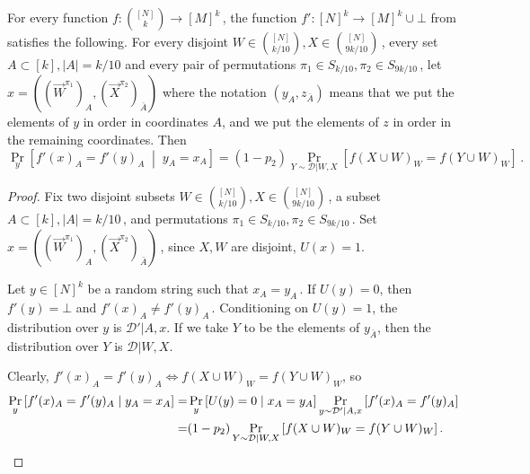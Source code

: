 \documentclass{toc}
\newcommand{\Prob}[2][]{\Pr_{{#1}}\left[#2\right]} %
\newcommand{\abs}[1]{\lvert#1\rvert} %
\newcommand{\given}{\;\middle\vert\;} %
\newcommand\f{f} %
\newcommand\setf{f} %
\newcommand{\sets}{\binom{[N]}{k}} %
\newcommand\rest[1]{{\bar{#1}}}  %
\begin{document}
\begin{claim} \label{claim:set to tuple equality}
	For every function $\setf:\sets\rightarrow[M]^k$\,, the function $\f':[N]^k\rightarrow[M]^k\cup\bot$ from  satisfies the following.
	For every disjoint $W\in\binom{[N]}{k/10}, X\in\binom{[N]}{9k/10}$\,, every set $A\subset[k],\abs{A}=k/10$ and
%
every pair of permutations  %
$\pi_1\in S_{k/10},\pi_2\in S_{9k/10}$\,, let $x=((\vec W^{\pi_1})_A,(\vec X^{\pi_2})_{\rest A})$ where the notation $(y_A, z_{\rest A})$ means that we put the elements of $y$ in order in coordinates $A$, and we put the elements of $z$ in order in the remaining coordinates. Then  
	\[ \Prob[y]{\f'(x)_A = \f'(y)_A\given y_A=x_A} =(1-p_2)\Prob[Y\sim\mathcal{D}|{W,X}]{\setf(X\cup W)_W = \setf(Y\cup W)_W}\,. \]
\end{claim}
\begin{proof}

    Fix two disjoint subsets $W\in\binom{[N]}{k/10}, X\in\binom{[N]}{9k/10}$\,, a subset $A\subset[k],\abs{A}=k/10$\,, and permutations $\pi_1\in
	{S}_{k/10},\pi_2\in{S}_{9k/10}$\,. Set $x=((\vec W^{\pi_1})_A,(\vec X^{\pi_2})_{\rest A})$\,, since $X,W$ are disjoint, $U(x)=1$. 
	
	Let $y\in[N]^k$ be a random string such that $x_A=y_A$\,. If $U(y)=0$, then $\f'(y)=\bot$ and $\f'(x)_A \neq \f'(y)_A$\,. Conditioning on $U(y)=1$, the distribution over $y$ is $\mathcal{D}'|{A,x}$. If we take $Y$ to be the elements of $y_\rest{A}$, then the distribution over $Y$ is $\mathcal{D}|W,X$. 
	
	Clearly, $\f'(x)_A=\f'(y)_A\iff \setf(X \cup W)_W=\setf(Y \cup W)_W$, so 
	\begin{align*}
	\Prob[y]{\f'(x)_A = \f'(y)_A\given y_A=x_A} =& \Prob[y]{U(y)=0\given x_A=y_A}\Prob[y\sim\mathcal{D}'|{A,x}]{\f'(x)_A = \f'(y)_A} \\
	=&(1-p_2)\Prob[Y\sim\mathcal{D}|{W,X}]{\setf(X\cup W)_W = \setf(Y\cup W)_W}.
\qedhere \end{align*}   %
\end{proof}
\end{document}
